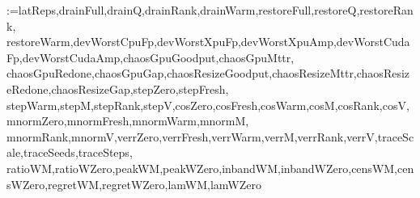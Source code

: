 \newcommand{\pending}{\textcolor{red}{n/a}}
\makeatletter
\@for\mvsname:=latReps,drainFull,drainQ,drainRank,drainWarm,restoreFull,restoreQ,restoreRank,%
restoreWarm,devWorstCpuFp,devWorstXpuFp,devWorstXpuAmp,devWorstCudaFp,devWorstCudaAmp,chaosGpuGoodput,chaosGpuMttr,%
chaosGpuRedone,chaosGpuGap,chaosResizeGoodput,chaosResizeMttr,chaosResizeRedone,chaosResizeGap,stepZero,stepFresh,%
stepWarm,stepM,stepRank,stepV,cosZero,cosFresh,cosWarm,cosM,cosRank,cosV,mnormZero,mnormFresh,mnormWarm,mnormM,%
mnormRank,mnormV,verrZero,verrFresh,verrWarm,verrM,verrRank,verrV,traceScale,traceSeeds,traceSteps,%
ratioWM,ratioWZero,peakWM,peakWZero,inbandWM,inbandWZero,censWM,censWZero,regretWM,regretWZero,lamWM,lamWZero%
\do{\@ifundefined{\mvsname}{\expandafter\let\csname\mvsname\endcsname\pending}{}}
\makeatother

